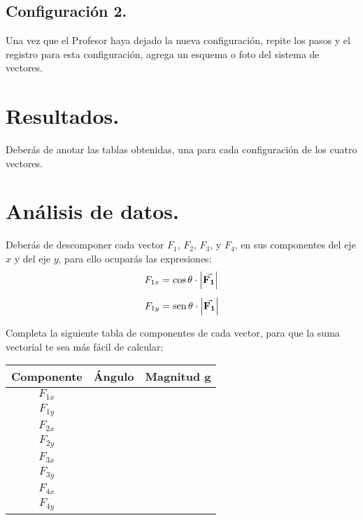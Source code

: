 \documentclass[14pt]{extarticle}
\begin{document}
\subsection{Configuración 2.}

Una vez que el Profesor haya dejado la nueva configuración, repite los pasos y el registro para esta configuración, agrega un esquema o foto del sistema de vectores.

\section{Resultados.}

Deberás de anotar las tablas obtenidas, una para cada configuración de los cuatro vectores.

\section{Análisis de datos.}

Deberás de descomponer cada vector $F_{1}$, $F_{2}$, $F_{3}$, y $F_{4}$, en sus componentes del eje $x$ y del eje $y$, para ello ocuparás las expresiones:
\begin{align*}
F_{1x} &= \cos \theta \cdot \abs{\va{F_{1}}} \\[0.5em]
F_{1y} &= \text{sen} \, \theta \cdot \abs{\va{F_{1}}}
\end{align*}

Completa la siguiente tabla de componentes de cada vector, para que la suma vectorial te sea más fácil de calcular:
\begin{table}[H]
\centering
\begin{tabular}{| c | p{3cm} | p{3cm} |} \hline
\textbf{Componente} & \multicolumn{1}{c|}{\textbf{Ángulo}} & \multicolumn{1}{c|}{\textbf{Magnitud} \unit{\gram}} \\ \hline
$F_{1x}$ & & \\ \hline
$F_{1y}$ & & \\ \hline
$F_{2x}$ & & \\ \hline
$F_{2y}$ & & \\ \hline
$F_{3x}$ & & \\ \hline
$F_{3y}$ & & \\ \hline
$F_{4x}$ & & \\ \hline
$F_{4y}$ & & \\ \hline
\end{tabular}
\end{table}
\end{document}
